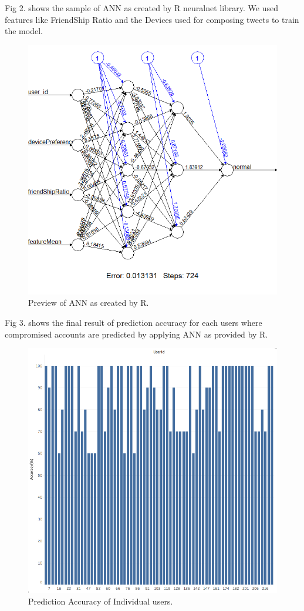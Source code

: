\documentclass[conference]{IEEEtran}
\begin{document}
 Fig 2. shows the sample of ANN as created by R neuralnet library. We used features like FriendShip Ratio and the Devices used for composing tweets 
 to train the model.
 

\begin{figure}[h!]
  \includegraphics[scale=0.4]{sample_ann1}
  \caption{Preview of ANN as created by R.}
\end{figure}

Fig 3. shows the final result of prediction accuracy for each users where compromised accounts are predicted by applying ANN as provided by R.

\begin{figure}[h!]
  \includegraphics[scale=0.4]{AccuracyMatrix}
  \caption{ Prediction Accuracy of Individual users.}
\end{figure}
\end{document}

